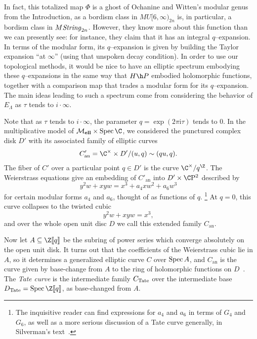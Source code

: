 In fact, this totalized map \(\Phi\) is a ghost of Ochanine and Witten's modular genus from the Introduction, as a bordism class in \(MU[6, \infty)_{2n}\) is, in particular, a bordism class in \(M\mathit{String}_{2n}\).
However, they know more about this function than we can presently see: for instance, they claim that it has an integral \(q\)--expansion.
In terms of the modular form, its \(q\)--expansion is given by building the Taylor expansion ``at \(\infty\)'' (using that unspoken decay condition).
In order to use our topological methods, it would be nice to have an elliptic spectrum embodying these \(q\)--expansions in the same way that \(H\h P\) embodied holomorphic functions, together with a comparison map that trades a modular form for its \(q\)--expansion.
The main ideas leading to such a spectrum come from considering the behavior of \(E_\Lambda\) as \(\tau\) tends to \(i \cdot \infty\).

\begin{definition}
Note that as \(\tau\) tends to \(i \cdot \infty\), the parameter \(q = \exp(2 \pi \mathrm i \tau)\) tends to \(0\).
In the multiplicative model of \(\moduli{ell} \times \Spec \C\), we considered the punctured complex disk \(D'\) with its associated family of elliptic curves \[C'_{\mathrm{an}} = \C^\times \times D' / (u, q) \sim (qu, q).\]
The fiber of \(C'\) over a particular point \(q \in D'\) is the curve \(\C^\times / q^{\Z}\).  %
The Weierstrass equations give an embedding of \(C'_{\mathrm{an}}\) into \(D' \times \CP^2\) described by \[y^2 w + x y w = x^3 + a_4 x w^2 + a_6 w^3\] for certain modular forms \(a_4\) and \(a_6\), thought of as functions of \(q\).%
\footnote{%
The inquisitive reader can find expressions for \(a_4\) and \(a_6\) in terms of \(G_4\) and \(G_6\), as well as a more serious discussion of a Tate curve generally, in Silverman's text~\cite[Section VI.1]{SilvermanAdvanced}.
}
At \(q = 0\), this curve collapses to the twisted cubic \[y^2 w + x y w = x^3,\] and over the whole open unit disc \(D\) we call this extended family \(C_{\mathrm{an}}\).

Now let \(A \subseteq \Z\ps{q}\) be the subring of power series which converge absolutely on the open unit disk.
It turns out that the coefficients of the Weierstrass cubic lie in \(A\), so it determines a generalized elliptic curve \(C\) over \(\operatorname{Spec} A\), and \(C_{\mathrm{an}}\) is the curve given by base-change from \(A\) to the ring of holomorphic functions on \(D\)~\cite[Section 5]{MoravaFormsOfKthy}.
The \textit{Tate curve} is the intermediate family \(C_{\mathrm{Tate}}\) over the intermediate base \(D_{\Tate} = \Spec \Z\ps{q}\), as base-changed from \(A\).
\end{definition}


